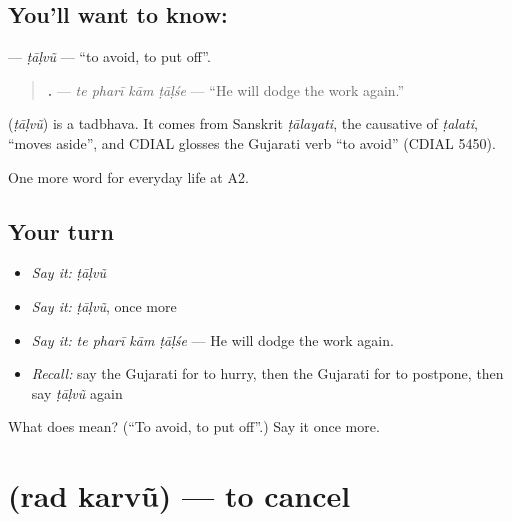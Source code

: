 \subsection*{You'll want to know: }
\textbf{} — \emph{ṭāḷvũ} — \textquotedblleft{}to avoid, to put off\textquotedblright{}.

\begin{quote}
\textbf{   .} — \emph{te pharī kām ṭāḷśe} — \textquotedblleft{}He will dodge the work again.\textquotedblright{}
\end{quote}

\begin{cousinweb}
\textbf{} (\emph{ṭāḷvũ}) is a tadbhava. It comes from Sanskrit \emph{ṭālayati}, the causative of \emph{ṭalati}, \textquotedblleft{}moves aside\textquotedblright{}, and CDIAL glosses the Gujarati verb \textquotedblleft{}to avoid\textquotedblright{} (CDIAL 5450).
\end{cousinweb}

\begin{grammarlens}[title={What you've built}]
One more word for everyday life at A2.
\end{grammarlens}

\subsection*{Your turn}
\begin{itemize}
\raggedright
  \item \emph{Say it:} \emph{ṭāḷvũ}
  \item \emph{Say it:} \emph{ṭāḷvũ}, once more
  \item \emph{Say it:} \emph{te pharī kām ṭāḷśe} — He will dodge the work again.
  \item \emph{Recall:} say the Gujarati for to hurry, then the Gujarati for to postpone, then say \emph{ṭāḷvũ} again
\end{itemize}

\begin{tcolorbox}[breakable,colback=teal!4,colframe=teal!35!black,title={Before you move on}]
What does  mean? (\textquotedblleft{}To avoid, to put off\textquotedblright{}.) Say it once more.
\end{tcolorbox}
\section[\texorpdfstring{\gu{રદ} \gu{કરવું} (rad karvũ)}{રદ કરવું (rad karvũ)}]{  (rad karvũ) — to cancel}

